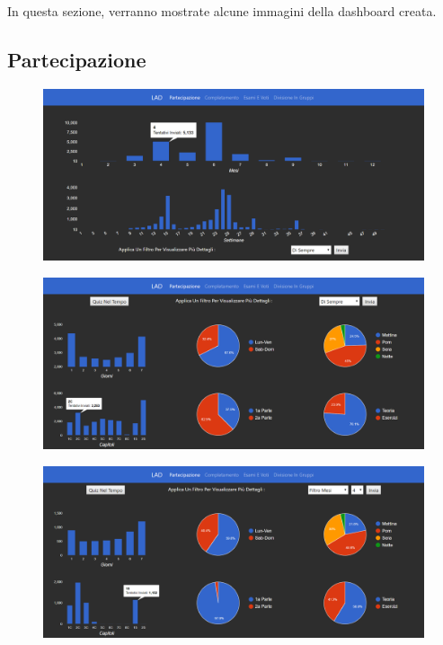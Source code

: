 In questa sezione, verranno mostrate alcune immagini della dashboard creata.

\subsection{Partecipazione}

\begin{figure}[H]
	\centering
	\includegraphics[width=160mm]{../Immagini/1}
\end{figure}

\begin{figure}[H]
	\centering
	\includegraphics[width=160mm]{../Immagini/2}
\end{figure}

\begin{figure}[H]
	\centering
	\includegraphics[width=160mm]{../Immagini/3}
\end{figure}

